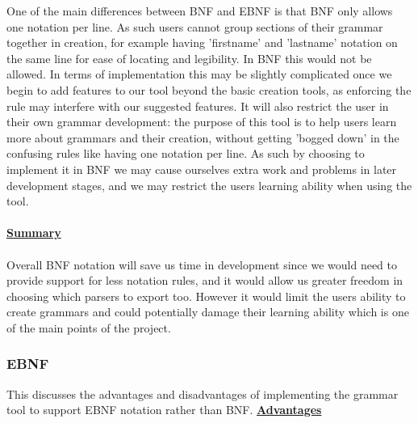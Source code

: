 \documentclass{l3proj}
\begin{document}
One of the main differences between BNF and EBNF is that BNF only allows one notation per line. As such users cannot group sections of their grammar together in creation, for example having 'firstname' and 'lastname' notation on the same line for ease of locating and legibility. In BNF this would not be allowed. In terms of implementation this may be slightly complicated once we begin to add features to our tool beyond the basic creation tools, as enforcing the rule may interfere with our suggested features. It will also restrict the user in their own grammar development: the purpose of this tool is to help users learn more about grammars and their creation, without getting 'bogged down' in the confusing rules like having one notation per line. As such by choosing to implement it in BNF we may cause ourselves extra work and problems in later development stages, and we may restrict the users learning ability when using the tool. \\
\\
\textbf {\underline{Summary}}\\
\\
Overall BNF notation will save us time in development since we would need to provide support for less notation rules, and it would allow us greater freedom in choosing which parsers to export too. However it would limit the users ability to create grammars and could potentially damage their learning ability which is one of the main points of the project.

\subsubsection{EBNF}
This discusses the advantages and disadvantages of implementing the grammar tool to support EBNF notation rather than BNF. 
\textbf {\underline{Advantages}}
\end{document}
